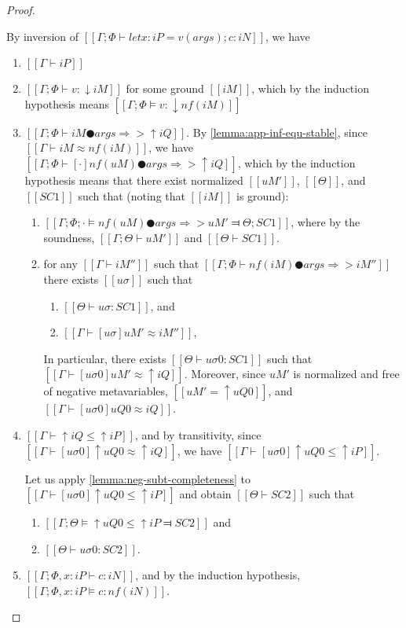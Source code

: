 \begin{proof}
\begin{caseof}
            By inversion of 
            $[[Γ ; Φ ⊢ let x:iP = v(args); c : iN]]$,
            we have
            \begin{enumerate}
                \item $[[Γ ⊢ iP]]$
                \item $[[Γ ; Φ ⊢ v : ↓iM]]$ for some ground $[[iM]]$,
                    which by the induction hypothesis means
                    $[[Γ ; Φ ⊨ v : ↓nf(iM)]]$
                \item $[[Γ ; Φ ⊢ iM ● args ⇒> ↑iQ]]$. 
                    By \cref{lemma:app-inf-equ-stable}, since
                    $[[Γ ⊢ iM ≈ nf(iM)]]$, we have
                    $[[Γ ; Φ ⊢ [·]nf(uM) ● args ⇒> ↑iQ]]$, 
                    which by the induction hypothesis means 
                    that there exist normalized 
                    $[[uM']]$, $[[Θ]]$, and $[[SC1]]$ such that
                    (noting that $[[iM]]$ is ground):
                    \begin{enumerate}
                        \item $[[ Γ; Φ; · ⊨ nf(uM) ● args ⇒> uM' ⫤ Θ; SC1 ]]$,
                            where by the soundness, $[[Γ; Θ ⊢ uM']]$ and $[[Θ ⊢ SC1]]$.
                        \item for any $[[Γ ⊢ iM'']]$ 
                            such that $[[Γ; Φ ⊢ nf(iM) ● args ⇒> iM'']]$
                            there exists $[[uσ]]$ such that 
                            \begin{enumerate}
                                \item $[[Θ ⊢ uσ : SC1]]$, and 
                                \item $[[Γ ⊢ [uσ]uM' ≈ iM'']]$,
                            \end{enumerate}
                            In particular, there exists
                            $[[Θ ⊢ uσ0 : SC1]]$ such that $[[Γ ⊢ [uσ0]uM' ≈ ↑iQ]]$.
                           Moreover, since $uM'$ is normalized and free of negative metavariables,
                            $[[uM' = ↑uQ0]]$, and $[[Γ ⊢ [uσ0]uQ0 ≈ iQ]]$.
                    \end{enumerate}
                \item $[[Γ ⊢ ↑iQ ≤ ↑iP]]$,
                    and by transitivity, since $[[Γ ⊢ [uσ0]↑uQ0 ≈ ↑iQ]]$,
                    we have $[[Γ ⊢ [uσ0]↑uQ0 ≤ ↑iP]]$.
                    
                    Let us apply \cref{lemma:neg-subt-completeness} to 
                    $[[Γ ⊢ [uσ0]↑uQ0  ≤ ↑iP]]$ and obtain
                    $[[Θ ⊢ SC2]]$ such that 
                    \begin{enumerate}
                        \item $[[Γ ; Θ ⊨ ↑uQ0 ≤ ↑iP ⫤ SC2]]$ and
                        \item $[[Θ ⊢ uσ0 : SC2]]$.
                    \end{enumerate}
                \item $[[Γ; Φ, x:iP ⊢ c : iN]]$, 
                    and by the induction hypothesis,
                    $[[Γ; Φ, x:iP ⊨ c : nf(iN)]]$.
            \end{enumerate}


\end{caseof}
\end{proof}
